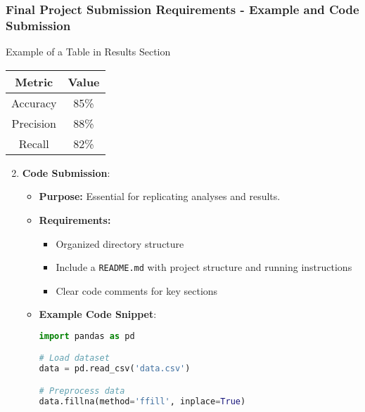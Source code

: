 \documentclass[aspectratio=169]{beamer}
\begin{document}
\begin{frame}[fragile]
    \frametitle{Final Project Submission Requirements - Example and Code Submission}
    \begin{block}{Example of a Table in Results Section}
        \begin{center}
        \begin{tabular}{|c|c|}
            \hline
            Metric & Value \\
            \hline
            Accuracy & 85\% \\
            Precision & 88\% \\
            Recall & 82\% \\
            \hline
        \end{tabular}
        \end{center}
    \end{block}
    
    \begin{enumerate}
        \setcounter{enumi}{1}
        \item \textbf{Code Submission}:
        \begin{itemize}
            \item \textbf{Purpose:} Essential for replicating analyses and results.
            \item \textbf{Requirements:}
            \begin{itemize}
                \item Organized directory structure
                \item Include a \texttt{README.md} with project structure and running instructions
                \item Clear code comments for key sections
            \end{itemize}
            \item \textbf{Example Code Snippet}:
            \begin{lstlisting}[language=Python]
import pandas as pd

# Load dataset
data = pd.read_csv('data.csv')

# Preprocess data
data.fillna(method='ffill', inplace=True)
            \end{lstlisting}
        \end{itemize}
    \end{enumerate}
\end{frame}
\end{document}
